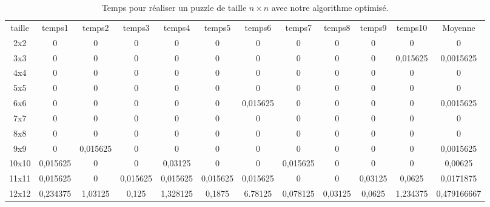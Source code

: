 



\begin{table}[h]
    \centering
	\begin{tabular}{|c|c|c|c|c|c|c|c|c|c|c|c|}
		\hline
		taille & temps1 & temps2 & temps3 & temps4 & temps5 & temps6 & temps7 & temps8 & temps9 & temps10 & Moyenne \\ 
		2x2 & 0 & 0 & 0 & 0 & 0 & 0 & 0 & 0 & 0 & 0 & 0 \\
		3x3 & 0 & 0 & 0 & 0 & 0 & 0 & 0 & 0 & 0 & 0,015625 & 0,0015625 \\
		4x4 & 0 & 0 & 0 & 0 & 0 & 0 & 0 & 0 & 0 & 0 & 0 \\
		5x5 & 0 & 0 & 0 & 0 & 0 & 0 & 0 & 0 & 0 & 0 & 0 \\
		6x6 & 0 & 0 & 0 & 0 & 0 & 0,015625 & 0 & 0 & 0 & 0 & 0,0015625 \\
		7x7 & 0 & 0 & 0 & 0 & 0 & 0 & 0 & 0 & 0 & 0 & 0 \\
		8x8 & 0 & 0 & 0 & 0 & 0 & 0 & 0 & 0 & 0 & 0 & 0 \\
		9x9 & 0 & 0,015625 & 0 & 0 & 0 & 0 & 0 & 0 & 0 & 0 & 0,0015625 \\
		10x10 & 0,015625 & 0 & 0 & 0,03125 & 0 & 0 & 0,015625 & 0 & 0 & 0 & 0,00625 \\
		11x11 & 0,015625 & 0 & 0,015625 & 0,015625 & 0,015625 & 0,015625 & 0 & 0 & 0,03125 & 0,0625 & 0,0171875 \\
		12x12 & 0,234375 & 1,03125 & 0,125 & 1,328125 & 0,1875 & 6.78125 & 0,078125 & 0,03125 & 0,0625 & 1,234375 & 0,479166667 \\
		\hline
	\end{tabular}
	\caption{Temps pour réaliser un puzzle de taille $n \times n$ avec notre algorithme optimisé.}
	\label{tab:temps_algo_opti}
\end{table}

		